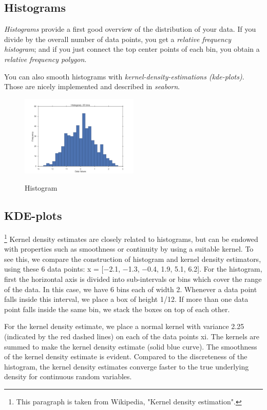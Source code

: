 \subsection{Histograms}


\emph{Histograms} provide a first good overview of the distribution of your data.
If you divide by the overall number of data points, you get a \emph{relative frequency
histogram}; and if you just connect the top center points of each bin, you obtain a
\emph{relative frequency polygon}.

You can also smooth histograms with \emph{kernel-density-estimations (kde-plots)}. Those are nicely implemented and described in \emph{seaborn}.

\begin{figure}[ht]
  \centering
  \includegraphics[width=0.5\textwidth]{../Images/Histogram.png}\\
  \caption{Histogram}
\end{figure}

\subsection{KDE-plots}

\footnote{This paragraph is taken from Wikipedia, "Kernel density estimation".} Kernel density estimates are closely related to histograms, but can be endowed with properties such as smoothness or continuity by using a suitable kernel. To see this, we compare the construction of histogram and kernel density estimators, using these 6 data points: x = [−2.1, −1.3, −0.4, 1.9, 5.1, 6.2]. For the histogram, first the horizontal axis is divided into sub-intervals or bins which cover the range of the data. In this case, we have 6 bins each of width 2. Whenever a data point falls inside this interval, we place a box of height 1/12. If more than one data point falls inside the same bin, we stack the boxes on top of each other.

For the kernel density estimate, we place a normal kernel with variance 2.25 (indicated by the red dashed lines) on each of the data points xi. The kernels are summed to make the kernel density estimate (solid blue curve). The smoothness of the kernel density estimate is evident. Compared to the discreteness of the histogram, the kernel density estimates converge faster to the true underlying density for continuous random variables.

